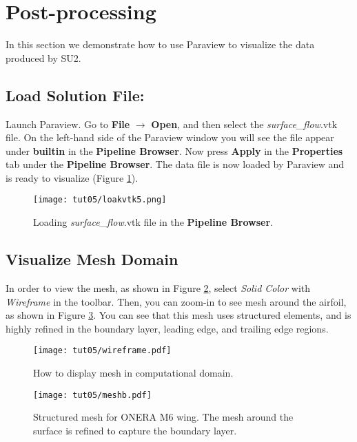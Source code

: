 \section{Post-processing}
In this section we demonstrate how to use Paraview to visualize the data produced by SU2.
\subsection{Load Solution File:}
Launch Paraview. Go to \textbf{File} $\rightarrow$ \textbf{Open}, and then select the \textit{surface\_flow}.vtk file. On the left-hand side of the Paraview window you will see the file appear under \textbf{builtin} in the \textbf{Pipeline Browser}. Now press \textbf{Apply} in the \textbf{Properties} tab under the  \textbf{Pipeline Browser}. The data file is now loaded by Paraview and is ready to visualize (Figure \ref{fig5:load}).
\begin{figure}[htbp]
    \centering
    \texttt{[image: tut05/loakvtk5.png]}
    \caption{Loading \textit{surface\_flow}.vtk file in the \textbf{Pipeline Browser}.}
    \label{fig5:load}
\end{figure}
\subsection{Visualize Mesh Domain}
In order to view the mesh, as shown in Figure \ref{fig5:wireframe}, select \textit{Solid Color} with \textit{Wireframe} in the toolbar. Then, you can zoom-in to see mesh around the airfoil, as shown in Figure \ref{fig5:mesh}. You can see that this mesh uses structured elements, and is highly refined in the boundary layer, leading edge, and trailing edge regions.
\begin{figure}[htbp]
    \centering
    \texttt{[image: tut05/wireframe.pdf]}
    \caption{How to display mesh in computational domain.}
    \label{fig5:wireframe}
\end{figure}
\begin{figure}[htbp]
    \centering
    \texttt{[image: tut05/meshb.pdf]}
    \caption{Structured mesh for ONERA M6 wing. The mesh around the surface is refined to capture the boundary layer.}
    \label{fig5:mesh}
\end{figure}
